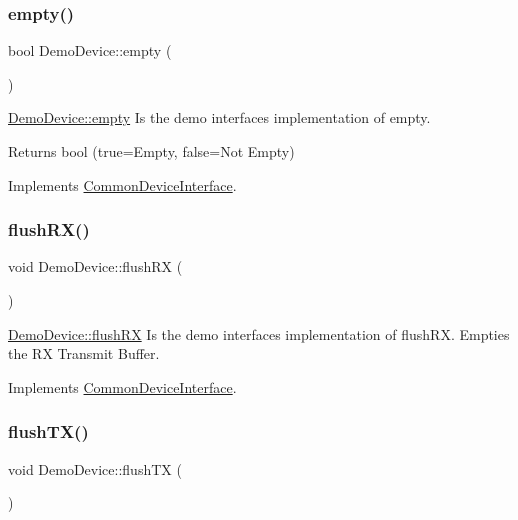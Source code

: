 \subsubsection{\texorpdfstring{empty()}{empty()}}
{\footnotesize\ttfamily bool Demo\+Device\+::empty (\begin{DoxyParamCaption}{ }\end{DoxyParamCaption})\hspace{0.3cm}{\ttfamily [virtual]}}



\hyperlink{class_demo_device_a52de363ec31fdbb540cf7cae6f584d22}{Demo\+Device\+::empty} Is the demo interface\textquotesingle{}s implementation of empty. 

\begin{DoxyReturn}{Returns}
bool (true=Empty, false=Not Empty) 
\end{DoxyReturn}


Implements \hyperlink{class_common_device_interface_ad670a54efd57ef65a659623f2a0b76e9}{Common\+Device\+Interface}.

\hypertarget{class_demo_device_abd7460c71a01d986b1f77908ccb779a2}{}\label{class_demo_device_abd7460c71a01d986b1f77908ccb779a2} 
\subsubsection{\texorpdfstring{flush\+R\+X()}{flushRX()}}
{\footnotesize\ttfamily void Demo\+Device\+::flush\+RX (\begin{DoxyParamCaption}{ }\end{DoxyParamCaption})\hspace{0.3cm}{\ttfamily [virtual]}}



\hyperlink{class_demo_device_abd7460c71a01d986b1f77908ccb779a2}{Demo\+Device\+::flush\+RX} Is the demo interface\textquotesingle{}s implementation of flush\+RX. Empties the RX Transmit Buffer. 



Implements \hyperlink{class_common_device_interface_a353c3bd7d63dfa9c3fa3d8bf1f392530}{Common\+Device\+Interface}.

\hypertarget{class_demo_device_a32e89c17f613abfa7f2a4d9f970bbffe}{}\label{class_demo_device_a32e89c17f613abfa7f2a4d9f970bbffe} 
\subsubsection{\texorpdfstring{flush\+T\+X()}{flushTX()}}
{\footnotesize\ttfamily void Demo\+Device\+::flush\+TX (\begin{DoxyParamCaption}{ }\end{DoxyParamCaption})\hspace{0.3cm}{\ttfamily [virtual]}}



